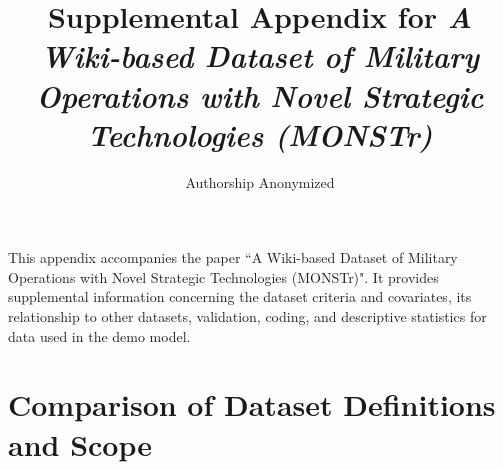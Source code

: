 \documentclass[fleqn,12pt]{article}
\title{\singlespacing Supplemental Appendix for \textit{A Wiki-based Dataset of Military Operations with Novel Strategic Technologies (MONSTr)}}
\author{Authorship Anonymized}
\date{}
\begin{document}
\maketitle

\doublespacing
\renewcommand\thetable{A\arabic{table}}
\renewcommand\thefigure{A\arabic{figure}}
\thispagestyle{empty}

This appendix accompanies the paper ``A Wiki-based Dataset of Military Operations with Novel Strategic Technologies (MONSTr)". It provides supplemental information concerning the dataset criteria and covariates, its relationship to other datasets, validation, coding, and descriptive statistics for data used in the demo model.

\tableofcontents

\newpage
\section{Comparison of Dataset Definitions and Scope}
\end{document}

